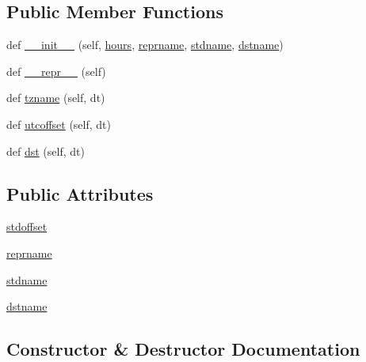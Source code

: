 \subsection*{Public Member Functions}
\begin{DoxyCompactItemize}
\item 
def \hyperlink{classpytz_1_1reference_1_1USTimeZone_a927828a005cb165feb80d6f1acc91a47}{\+\_\+\+\_\+init\+\_\+\+\_\+} (self, \hyperlink{namespacepytz_af8649e079377bfcda685487b70ffee4a}{hours}, \hyperlink{classpytz_1_1reference_1_1USTimeZone_a1a3bc7dd2c3008485894ebc14c08169a}{reprname}, \hyperlink{classpytz_1_1reference_1_1USTimeZone_a166454a6e1f9d054a919b15155e53b4d}{stdname}, \hyperlink{classpytz_1_1reference_1_1USTimeZone_a1a362370749072679d8bc8f7c6895c24}{dstname})
\item 
def \hyperlink{classpytz_1_1reference_1_1USTimeZone_a882cbbef6e66996ecc6d87f1bd4211f8}{\+\_\+\+\_\+repr\+\_\+\+\_\+} (self)
\item 
def \hyperlink{classpytz_1_1reference_1_1USTimeZone_ad720e2a892df60fd1ce14f1a66694b4b}{tzname} (self, dt)
\item 
def \hyperlink{classpytz_1_1reference_1_1USTimeZone_a5b16d5cd1a9cbbf329fb67865265e6f7}{utcoffset} (self, dt)
\item 
def \hyperlink{classpytz_1_1reference_1_1USTimeZone_a9567816b058cb53ac2e392e86f5c9677}{dst} (self, dt)
\end{DoxyCompactItemize}
\subsection*{Public Attributes}
\begin{DoxyCompactItemize}
\item 
\hyperlink{classpytz_1_1reference_1_1USTimeZone_a978a629ad9565e69e8bb0fcc16d53eff}{stdoffset}
\item 
\hyperlink{classpytz_1_1reference_1_1USTimeZone_a1a3bc7dd2c3008485894ebc14c08169a}{reprname}
\item 
\hyperlink{classpytz_1_1reference_1_1USTimeZone_a166454a6e1f9d054a919b15155e53b4d}{stdname}
\item 
\hyperlink{classpytz_1_1reference_1_1USTimeZone_a1a362370749072679d8bc8f7c6895c24}{dstname}
\end{DoxyCompactItemize}


\subsection{Constructor \& Destructor Documentation}
\mbox{\label{classpytz_1_1reference_1_1USTimeZone_a927828a005cb165feb80d6f1acc91a47}} 
